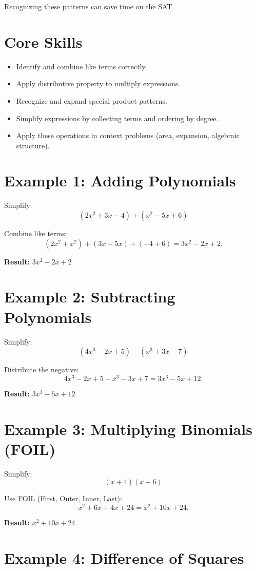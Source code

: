 \documentclass[14pt]{extarticle}
\begin{document}
Recognizing these patterns can save time on the SAT.

\section*{Core Skills}
\begin{itemize}
  \item Identify and combine like terms correctly.
  \item Apply distributive property to multiply expressions.
  \item Recognize and expand special product patterns.
  \item Simplify expressions by collecting terms and ordering by degree.
  \item Apply these operations in context problems (area, expansion, algebraic structure).
\end{itemize}

\section*{Example 1: Adding Polynomials}

Simplify:
\[
(2x^2 + 3x - 4) + (x^2 - 5x + 6)
\]

Combine like terms:
\[
(2x^2 + x^2) + (3x - 5x) + (-4 + 6) = 3x^2 - 2x + 2.
\]

\textbf{Result:} \(\boxed{3x^2 - 2x + 2}\)

\section*{Example 2: Subtracting Polynomials}

Simplify:
\[
(4x^3 - 2x + 5) - (x^3 + 3x - 7)
\]

Distribute the negative:
\[
4x^3 - 2x + 5 - x^3 - 3x + 7 = 3x^3 - 5x + 12.
\]

\textbf{Result:} \(\boxed{3x^3 - 5x + 12}\)

\section*{Example 3: Multiplying Binomials (FOIL)}

Simplify:
\[
(x + 4)(x + 6)
\]

Use FOIL (First, Outer, Inner, Last):
\[
x^2 + 6x + 4x + 24 = x^2 + 10x + 24.
\]

\textbf{Result:} \(\boxed{x^2 + 10x + 24}\)

\section*{Example 4: Difference of Squares}
\end{document}
